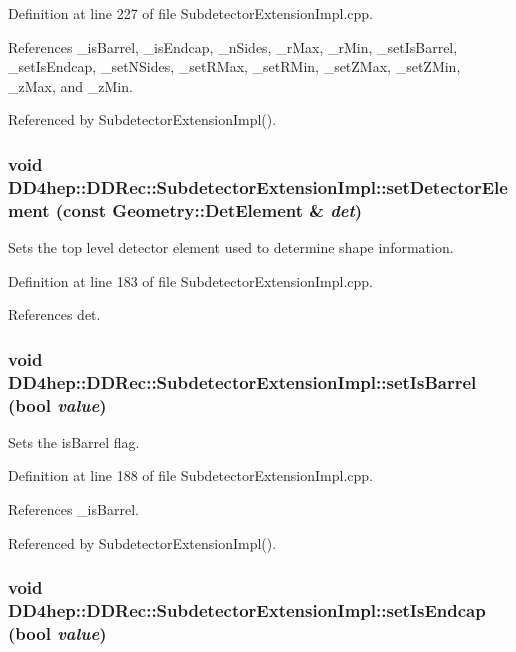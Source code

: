 Definition at line 227 of file SubdetectorExtensionImpl.cpp.

References \_\-isBarrel, \_\-isEndcap, \_\-nSides, \_\-rMax, \_\-rMin, \_\-setIsBarrel, \_\-setIsEndcap, \_\-setNSides, \_\-setRMax, \_\-setRMin, \_\-setZMax, \_\-setZMin, \_\-zMax, and \_\-zMin.

Referenced by SubdetectorExtensionImpl().\hypertarget{class_d_d4hep_1_1_d_d_rec_1_1_subdetector_extension_impl_a6b2e5282d0f58128a056e95459d61939}{
\subsubsection[{setDetectorElement}]{\setlength{\rightskip}{0pt plus 5cm}void DD4hep::DDRec::SubdetectorExtensionImpl::setDetectorElement (const {\bf Geometry::DetElement} \& {\em det})}}
\label{class_d_d4hep_1_1_d_d_rec_1_1_subdetector_extension_impl_a6b2e5282d0f58128a056e95459d61939}


Sets the top level detector element used to determine shape information. 

Definition at line 183 of file SubdetectorExtensionImpl.cpp.

References det.\hypertarget{class_d_d4hep_1_1_d_d_rec_1_1_subdetector_extension_impl_ad63db1c5bca1c435c0f79514f47798d0}{
\subsubsection[{setIsBarrel}]{\setlength{\rightskip}{0pt plus 5cm}void DD4hep::DDRec::SubdetectorExtensionImpl::setIsBarrel (bool {\em value})}}
\label{class_d_d4hep_1_1_d_d_rec_1_1_subdetector_extension_impl_ad63db1c5bca1c435c0f79514f47798d0}


Sets the isBarrel flag. 

Definition at line 188 of file SubdetectorExtensionImpl.cpp.

References \_\-isBarrel.

Referenced by SubdetectorExtensionImpl().\hypertarget{class_d_d4hep_1_1_d_d_rec_1_1_subdetector_extension_impl_acd89d4d2553a6ba4006ad39631fa864b}{
\subsubsection[{setIsEndcap}]{\setlength{\rightskip}{0pt plus 5cm}void DD4hep::DDRec::SubdetectorExtensionImpl::setIsEndcap (bool {\em value})}}
\label{class_d_d4hep_1_1_d_d_rec_1_1_subdetector_extension_impl_acd89d4d2553a6ba4006ad39631fa864b}


